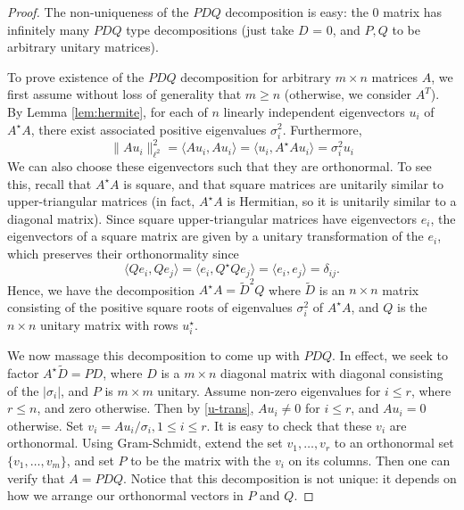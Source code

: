 \documentclass[12pt]{article}
\theoremstyle{plain}
\theoremstyle{definition}
\theoremstyle{remark}
\numberwithin{equation}{section}  %
\begin{document}
\begin{proof}
	The non-uniqueness of the $PDQ$ decomposition is easy: the $0$ matrix has
	infinitely many $PDQ$ type decompositions (just take $D$ = 0, and $P, Q$ to be
	arbitrary unitary matrices).

	To prove existence of the $PDQ$ decomposition for arbitrary $m \times n$ matrices $A$, we
	first assume without loss of generality that $m \ge n$ (otherwise, we consider $A^T$).
	By Lemma \ref{lem:hermite}, for each of $n$ linearly independent eigenvectors
	$u_i$ of $A^{\star}A$, there exist associated positive eigenvalues $\sigma_i^2$.
	Furthermore,
	\begin{equation}
		\label{u-trans}
		\| A u_i \|_{\ell^2}^2 = \langle Au_i, Au_i \rangle  = \langle u_i, A^{\star}A
		u_i \rangle = \sigma_i^{2} u_i
	\end{equation}
	We can also choose these eigenvectors such that they are orthonormal. To see
	this, recall that $A^{\star}A$ is square, and that square matrices
	are unitarily similar to upper-triangular matrices (in fact, $A^\star A$ is
	Hermitian, so it is unitarily similar to a diagonal matrix).
	Since square upper-triangular matrices have eigenvectors $e_i$, the eigenvectors
	of a square matrix are given by a unitary transformation of the $e_i$,
	which preserves their orthonormality since
	\begin{equation*}
		\langle Q e_i, Qe_j \rangle  = \langle e_i, Q^{\star}Q e_j \rangle  = \langle
		e_i, e_j \rangle  = \delta_{ij}.
	\end{equation*}
	Hence, we have the decomposition $A^{\star}A = \tilde{D}^{2}Q$ where $\tilde{D}$ is an $n \times n$
	matrix consisting of the positive square roots of eigenvalues $\sigma_i^2$ of
	$A^{\star}A$, and $Q$ is the $n \times n$ unitary matrix with rows
	$u_i^{\star}$. 

	We now massage this decomposition to come up with $PDQ$. In effect, we seek to
	factor $A^{\star}\tilde{D} = PD$, where $D$ is a $m \times n$ diagonal matrix
	with diagonal consisting of the $ |\sigma_i|$, and $P$ is $m \times m$ unitary. 
	Assume non-zero eigenvalues for $i \le r$, where $r \le n$, and zero otherwise.
	Then by \eqref{u-trans}, $A u_i \neq 0$ for $i \le r$, and $A u_i = 0$ otherwise.
	Set $v_i = Au_i/\sigma_i, 1 \le i \le r$. It is easy to check that these $v_i$ are orthonormal.
	Using Gram-Schmidt, extend the set ${v_1, \ldots, v_r}$ to an orthonormal set
	$\{v_1, \ldots, v_m \}$, and set $P$ to be the matrix with the $v_i$ on its columns.
	Then one can verify that $A = PDQ$. Notice that this decomposition is not unique: it depends on how we
	arrange our orthonormal vectors in $P$ and $Q$. 
\end{proof}
\end{document}
